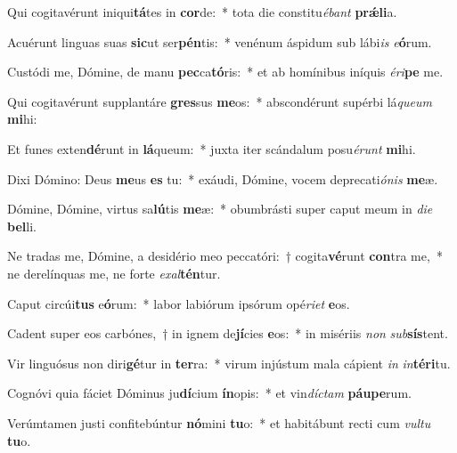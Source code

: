 \item Qui cogitavérunt iniqui\textbf{tá}tes in \textbf{cor}de:~* tota die constitu\textit{é}\textit{bant} \textbf{prǽ}\textbf{li}a.
\item Acuérunt linguas suas \textbf{sic}ut ser\textbf{pén}tis:~* venénum áspidum sub lábi\textit{is} \textit{e}\textbf{ó}rum.
\item Custódi me, Dómine, de manu \textbf{pec}ca\textbf{tó}ris:~* et ab homínibus iníquis \textit{é}\textit{ri}\textbf{pe} me.
\item Qui cogitavérunt supplantáre \textbf{gres}sus \textbf{me}os:~* abscondérunt supérbi lá\textit{que}\textit{um} \textbf{mi}hi:
\item Et funes exten\textbf{dé}runt in \textbf{lá}queum:~* juxta iter scándalum posu\textit{é}\textit{runt} \textbf{mi}hi.
\item Dixi Dómino: Deus \textbf{me}us \textbf{es} tu:~* exáudi, Dómine, vocem deprecati\textit{ó}\textit{nis} \textbf{me}æ.
\item Dómine, Dómine, virtus sa\textbf{lú}tis \textbf{me}æ:~* obumbrásti super caput meum in \textit{di}\textit{e} \textbf{bel}li.
\item Ne tradas me, Dómine, a desidério meo peccatóri:~† cogita\textbf{vé}runt \textbf{con}tra me,~* ne derelínquas me, ne forte \textit{ex}\textit{al}\textbf{tén}tur.
\item Caput circúi\textbf{tus} e\textbf{ó}rum:~* labor labiórum ipsórum opé\textit{ri}\textit{et} \textbf{e}os.
\item Cadent super eos carbónes,~† in ignem de\textbf{jí}cies \textbf{e}os:~* in misériis \textit{non} \textit{sub}\textbf{sís}tent.
\item Vir linguósus non diri\textbf{gé}tur in \textbf{ter}ra:~* virum injústum mala cápient \textit{in} \textit{in}\textbf{tér}\textbf{i}tu.
\item Cognóvi quia fáciet Dóminus ju\textbf{dí}cium \textbf{ín}opis:~* et vin\textit{díc}\textit{tam} \textbf{páu}\textbf{pe}rum.
\item Verúmtamen justi confitebúntur \textbf{nó}mini \textbf{tu}o:~* et habitábunt recti cum \textit{vul}\textit{tu} \textbf{tu}o.
